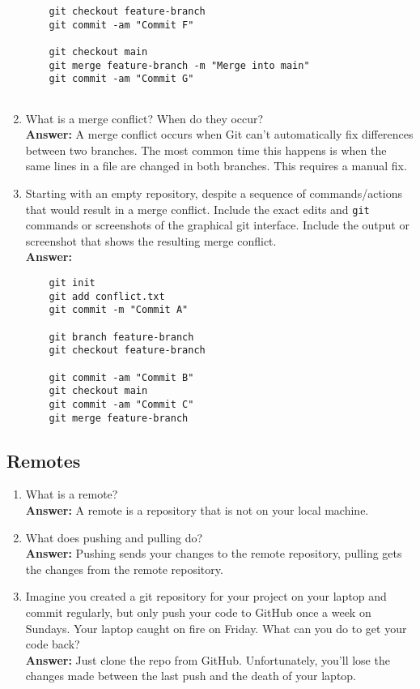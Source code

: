 \documentclass[10pt,twocolumn]{article}
\begin{document}
\begin{enumerate}
    \begin{verbatim}
    git checkout feature-branch
    git commit -am "Commit F"
    
    git checkout main
    git merge feature-branch -m "Merge into main"
    git commit -am "Commit G"
      

    \end{verbatim}

\item What is a merge conflict? When do they occur?\\
    \textbf{Answer:}
    A merge conflict occurs when Git can't automatically fix differences between two branches. The most common time this happens is when the same lines in a file are changed in both branches. This requires a manual fix.

\item Starting with an empty repository, despite a sequence of commands/actions that would result in a merge conflict. Include the exact edits and \texttt{git} commands or screenshots of the graphical git interface. Include the output or screenshot that shows the resulting merge conflict.\\
    \textbf{Answer:}
    \begin{verbatim}
    git init 
    git add conflict.txt 
    git commit -m "Commit A"

    git branch feature-branch 
    git checkout feature-branch 

    git commit -am "Commit B"
    git checkout main 
    git commit -am "Commit C"
    git merge feature-branch 
    \end{verbatim}

\end{enumerate}

\subsection{Remotes}

\begin{enumerate}
\item What is a remote?\\
    \textbf{Answer:}
    A remote is a repository that is not on your local machine.

\item What does pushing and pulling do?\\
    \textbf{Answer:}
    Pushing sends your changes to the remote repository, pulling gets the changes from the remote repository.

\item Imagine you created a git repository for your project on your laptop and commit regularly, but only push your code to GitHub once a week on Sundays. Your laptop caught on fire on Friday. What can you do to get your code back?\\
    \textbf{Answer:}
    Just clone the repo from GitHub. Unfortunately, you'll lose the changes made between the last push and the death of your laptop.

\end{enumerate}
\end{document}
